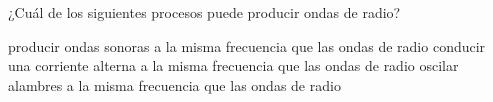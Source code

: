 ¿Cuál de los siguientes procesos puede producir ondas de radio?

\begin{choices}
    \choice producir ondas sonoras a la misma frecuencia que las ondas de
    radio
    \choice conducir una corriente alterna a la misma frecuencia que las
    ondas de radio
    \choice oscilar alambres a la misma frecuencia que las ondas de radio
\end{choices}